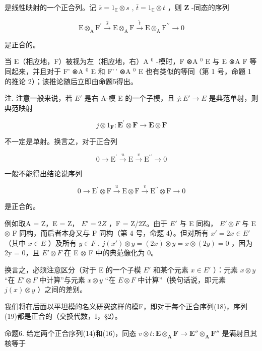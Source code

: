 是线性映射的一个正合列。记 \(\bar{s} = 1_{\mathbb{E}} \otimes s\) , \(\bar{t} = 1_{\mathbb{E}} \otimes t\) ，则 \(\mathbf{Z}\) -同态的序列

\[
\mathrm{E} \otimes_ {\mathrm{A}} \mathrm{F} ^ {\prime} \stackrel {\hat {s}} {\longrightarrow} \mathrm{E} \otimes_ {\mathrm{A}} \mathrm{F} \stackrel {\hat {t}} {\longrightarrow} \mathrm{E} \otimes_ {\mathrm{A}} \mathrm{F} ^ {\prime \prime} \longrightarrow 0\tag{17}
\]

是正合的。

当 E（相应地，F）被视为左（相应地，右）A \(^{0}\) -模时，F ⊗A \(^{0}\) E 与 E ⊗A F 等同起来，并且对于 F' ⊗A \(^{0}\) E 和 F'\,' ⊗A \(^{0}\) E 也有类似的等同（第 1 号，命题 1 的推论 2）；该推论随后立即由命题5得出。

注. 注意一般来说，若 \(E'\) 是右 A-模 E 的一个子模，且 \(j:E'\to E\) 是典范单射，则典范映射

\[
j \otimes 1 _ {\mathbf {F}}: \mathbf {E} ^ {\prime} \otimes \mathbf {F} \rightarrow \mathbf {E} \otimes \mathbf {F}
\]

不一定是单射。换言之，对于正合列

\[
0 \longrightarrow \mathrm{E} ^ {\prime} \stackrel {u} {\longrightarrow} \mathrm{E} \stackrel {v} {\longrightarrow} \mathrm{E} ^ {\prime \prime} \longrightarrow 0\tag{18}
\]

一般不能得出结论说序列

\[
0 \longrightarrow \mathrm{E} ^ {\prime} \otimes \mathrm{F} \stackrel {u} {\longrightarrow} \mathrm{E} \otimes \mathrm{F} \stackrel {v} {\longrightarrow} \mathrm{E} ^ {\prime \prime} \otimes \mathrm{F} \longrightarrow 0\tag{19}
\]

是正合的。

例如取A = Z，E = Z， \(E' = 2Z\) ，F = Z/2Z。由于 \(E'\) 与 E 同构， \(E' \otimes F\) 与 E \(\otimes\) F 同构，而后者本身又与 F 同构（第 4 号，命题 4）。但对所有 \(x' = 2x \in E'\) （其中 \(x \in E\) ）及所有 \(y \in F\) , \(j(x') \otimes y = (2x) \otimes y = x \otimes (2y) = 0\) ，因为 2y = 0，且 \(E' \otimes F\) 在 E \(\otimes\) F 中的典范像化为 0。

换言之，必须注意区分（对于 E 的一个子模 \(E'\) 和某个元素 \(x \in E'\) ）：元素 \(x \otimes y\) “在 \(E' \otimes F\) 中计算''与元素 \(x \otimes y\) “在 \(E \otimes F\) 中计算''（换句话说，即元素 \(j(x) \otimes y\) ）之间的差别。

我们将在后面以平坦模的名义研究这样的模F，即对于每个正合序列(18)，序列(19)都是正合的（交换代数，I，§2）。

命题6. 给定两个正合序列(14)和(16)，同态 \(v \otimes t: \mathbf{E} \otimes_{\mathbf{A}} \mathbf{F} \to \mathbf{E}'' \otimes_{\mathbf{A}} \mathbf{F}''\) 是满射且其核等于

